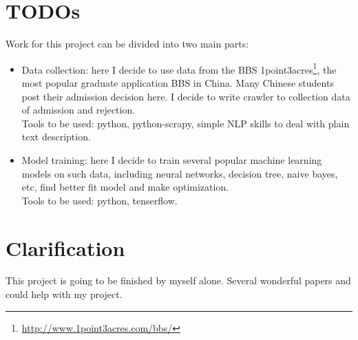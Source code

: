 \documentclass{article}
\begin{document}
\section{TODOs}

Work for this project can be divided into two main parts:

\begin{itemize}
    \item Data collection: here I decide to use data from the BBS 1point3acres\footnote{\url{http://www.1point3acres.com/bbs/}}, the most popular graduate application BBS in China. Many Chinese students post their admission decision here. I decide to write crawler to collection data of admission and rejection.\\
    Tools to be used: python, python-scrapy, simple NLP skills to deal with plain text description.
    \item Model training: here I decide to train several popular machine learning models on such data, including neural networks, decision tree, naive bayes, etc, find better fit model and make optimization.\\
    Tools to be used: python, tenserflow.
\end{itemize}

\section{Clarification}

This project is going to be finished by myself alone. Several wonderful papers \cite{gupta2016will} and \cite{keeley1972bayesian} could help with my project.



\end{document}
